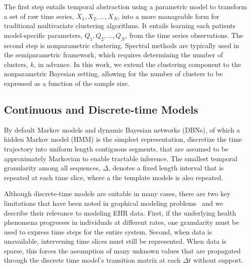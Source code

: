 The first step entails temporal abstraction using a parametric model to transform a set of raw time series, $X_1,X_2,...,X_N$, into a more manageable form for traditional multivariate clustering algorithms. It entails learning each patients model-specific parameters, $Q_1,Q_2,...,Q_N$, from the time series observations.  The second step is nonparametric clustering.  Spectral methods are typically used in the semiparametric framework, which requires determining the number of clusters, $k$, in advance.  In this work, we extend the clustering component to the nonparametric Bayesian setting, allowing for the number of clusters to be expressed as a function of the sample size.


\subsection{Continuous and Discrete-time Models}
 By default Markov models and dynamic Bayesian networks (DBNs), of which a hidden Markov model (HMM) is the simplest representation, discretize the time trajectory into uniform length contiguous segments, that are assumed to be approximately Markovian to enable tractable inference.  The smallest temporal granularity among all sequences, $\Delta$, denotes a fixed length interval that is repeated at each time slice, where a the template models is also repeated.

 Although discrete-time models are suitable in many cases, there are two key limitations that have been noted in graphical modeling problems~\cite{Nodelman02} and we describe their relevance to modeling EHR data. First, if the underlying health phenomena progresses in individuals at different rates, one granularity must be used to express time steps for the entire system. Second, when data is unavailable, intervening time slices must still be represented.  When data is sparse, this forces the assumption of many unknown values that are propagated through the discrete time model's transition matrix at each $\Delta t$ without support.

